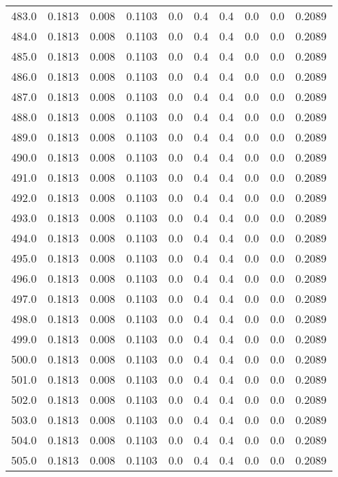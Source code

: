 \begin{longtable}{lrrrrrrrrr}
483.0 & 0.1813 & 0.008 & 0.1103 & 0.0 & 0.4 & 0.4 & 0.0 & 0.0 & 0.2089 \\
484.0 & 0.1813 & 0.008 & 0.1103 & 0.0 & 0.4 & 0.4 & 0.0 & 0.0 & 0.2089 \\
485.0 & 0.1813 & 0.008 & 0.1103 & 0.0 & 0.4 & 0.4 & 0.0 & 0.0 & 0.2089 \\
486.0 & 0.1813 & 0.008 & 0.1103 & 0.0 & 0.4 & 0.4 & 0.0 & 0.0 & 0.2089 \\
487.0 & 0.1813 & 0.008 & 0.1103 & 0.0 & 0.4 & 0.4 & 0.0 & 0.0 & 0.2089 \\
488.0 & 0.1813 & 0.008 & 0.1103 & 0.0 & 0.4 & 0.4 & 0.0 & 0.0 & 0.2089 \\
489.0 & 0.1813 & 0.008 & 0.1103 & 0.0 & 0.4 & 0.4 & 0.0 & 0.0 & 0.2089 \\
490.0 & 0.1813 & 0.008 & 0.1103 & 0.0 & 0.4 & 0.4 & 0.0 & 0.0 & 0.2089 \\
491.0 & 0.1813 & 0.008 & 0.1103 & 0.0 & 0.4 & 0.4 & 0.0 & 0.0 & 0.2089 \\
492.0 & 0.1813 & 0.008 & 0.1103 & 0.0 & 0.4 & 0.4 & 0.0 & 0.0 & 0.2089 \\
493.0 & 0.1813 & 0.008 & 0.1103 & 0.0 & 0.4 & 0.4 & 0.0 & 0.0 & 0.2089 \\
494.0 & 0.1813 & 0.008 & 0.1103 & 0.0 & 0.4 & 0.4 & 0.0 & 0.0 & 0.2089 \\
495.0 & 0.1813 & 0.008 & 0.1103 & 0.0 & 0.4 & 0.4 & 0.0 & 0.0 & 0.2089 \\
496.0 & 0.1813 & 0.008 & 0.1103 & 0.0 & 0.4 & 0.4 & 0.0 & 0.0 & 0.2089 \\
497.0 & 0.1813 & 0.008 & 0.1103 & 0.0 & 0.4 & 0.4 & 0.0 & 0.0 & 0.2089 \\
498.0 & 0.1813 & 0.008 & 0.1103 & 0.0 & 0.4 & 0.4 & 0.0 & 0.0 & 0.2089 \\
499.0 & 0.1813 & 0.008 & 0.1103 & 0.0 & 0.4 & 0.4 & 0.0 & 0.0 & 0.2089 \\
500.0 & 0.1813 & 0.008 & 0.1103 & 0.0 & 0.4 & 0.4 & 0.0 & 0.0 & 0.2089 \\
501.0 & 0.1813 & 0.008 & 0.1103 & 0.0 & 0.4 & 0.4 & 0.0 & 0.0 & 0.2089 \\
502.0 & 0.1813 & 0.008 & 0.1103 & 0.0 & 0.4 & 0.4 & 0.0 & 0.0 & 0.2089 \\
503.0 & 0.1813 & 0.008 & 0.1103 & 0.0 & 0.4 & 0.4 & 0.0 & 0.0 & 0.2089 \\
504.0 & 0.1813 & 0.008 & 0.1103 & 0.0 & 0.4 & 0.4 & 0.0 & 0.0 & 0.2089 \\
505.0 & 0.1813 & 0.008 & 0.1103 & 0.0 & 0.4 & 0.4 & 0.0 & 0.0 & 0.2089 \\

\end{longtable}
